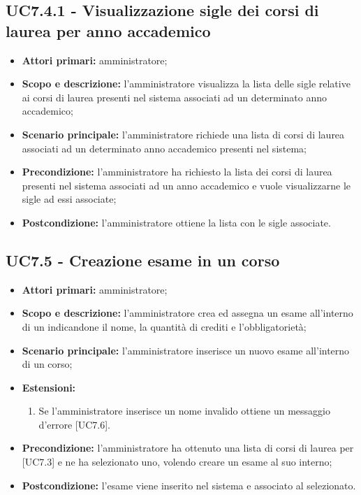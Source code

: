 \documentclass[AnalisiDeiRequisiti.tex]{subfiles}
\begin{document}
\subsection{UC7.4.1 - Visualizzazione sigle dei corsi di laurea per anno accademico}
\begin{itemize}
	\item \textbf{Attori primari:} amministratore;
	\item \textbf{Scopo e descrizione:} l'amministratore visualizza la lista delle sigle relative ai corsi di laurea presenti nel sistema associati ad un determinato anno accademico;
	\item \textbf{Scenario principale:} l'amministratore richiede una lista di corsi di laurea associati ad un determinato anno accademico presenti nel sistema;
	\item \textbf{Precondizione:} l'amministratore ha richiesto la lista dei corsi di laurea presenti nel sistema associati ad un anno accademico e vuole visualizzarne le sigle ad essi associate; 
	\item \textbf{Postcondizione:} l'amministratore ottiene la lista con le sigle associate.
\end{itemize}
\subsection{UC7.5 - Creazione esame in un corso}
\begin{itemize}
	\item \textbf{Attori primari:} amministratore;
	\item \textbf{Scopo e descrizione:} l'amministratore crea ed assegna un esame all'interno di un  indicandone il nome, la quantità di crediti e l'obbligatorietà;
	\item \textbf{Scenario principale:} l'amministratore inserisce un nuovo esame all'interno di un corso;
	\item \textbf{Estensioni:}
	\begin{enumerate}
		\item Se l'amministratore inserisce un nome invalido ottiene un messaggio d'errore [UC7.6].
	\end{enumerate}
	\item \textbf{Precondizione:} l'amministratore ha ottenuto una lista di corsi di laurea per  [UC7.3] e ne ha selezionato uno, volendo creare un esame al suo interno; 
	\item \textbf{Postcondizione:} l'esame viene inserito nel sistema e associato al  selezionato.
\end{itemize}
\end{document}
